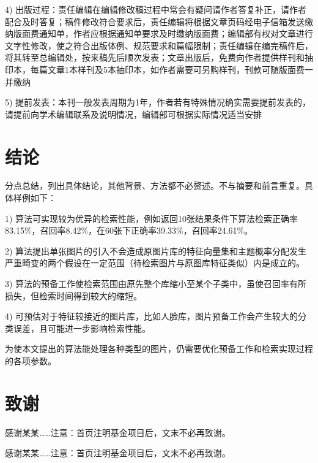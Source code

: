 \documentclass[10.5pt,twocolumn]{aaas}
\begin{document}
4) 出版过程：责任编辑在编辑修改稿过程中常会有疑问请作者答复补正，请作者配合及时答复；稿件修改符合要求后，责任编辑将根据文章页码经电子信箱发送缴纳版面费通知单，作者应根据通知单要求及时缴纳版面费；编辑部有权对文章进行文字性修改，使之符合出版体例、规范要求和篇幅限制；责任编辑在编完稿件后，将其转至总编辑处，按来稿先后顺次发表；文章出版后，免费向作者提供样刊和抽印本，每篇文章1本样刊及5本抽印本，如作者需要可另购样刊，刊款可随版面费一并缴纳

5) 提前发表：本刊一般发表周期为1年，作者若有特殊情况确实需要提前发表的，请提前向学术编辑联系及说明情况，编辑部可根据实际情况适当安排

\section{结\quad 论}
分点总结，列出具体结论，其他背景、方法都不必赘述。不与摘要和前言重复。具体样例如下：

1) 算法可实现较为优异的检索性能，例如返回10张结果条件下算法检索正确率83.15\%，召回率8.42\%，在60张下正确率39.33\%，召回率24.61\%。

2) 算法提出单张图片的引入不会造成原图片库的特征向量集和主题概率分配发生严重畸变的两个假设在一定范围（待检索图片与原图库特征类似）内是成立的。

3) 算法的预备工作使检索范围由原先整个库缩小至某个子类中，虽使召回率有所损失，但检索时间得到较大的缩短。

4) 可预估对于特征较接近的图片库，比如人脸库，图片预备工作会产生较大的分类误差，且可能进一步影响检索性能。

为使本文提出的算法能处理各种类型的图片，仍需要优化预备工作和检索实现过程的各项参数。


\section{致谢}

\vspace{1em}
{\wuhao
感谢某某……注意：首页注明基金项目后，文末不必再致谢。
}

\vspace{1em}
{\wuhao 
感谢某某……注意：首页注明基金项目后，文末不必再致谢。
}




\renewcommand\refname{\hei\wuhao\centerline{参\quad 考\quad 文\quad 献（20条以上）}\global\def\refname{参考文献}}
\vskip 12pt
\end{document}

